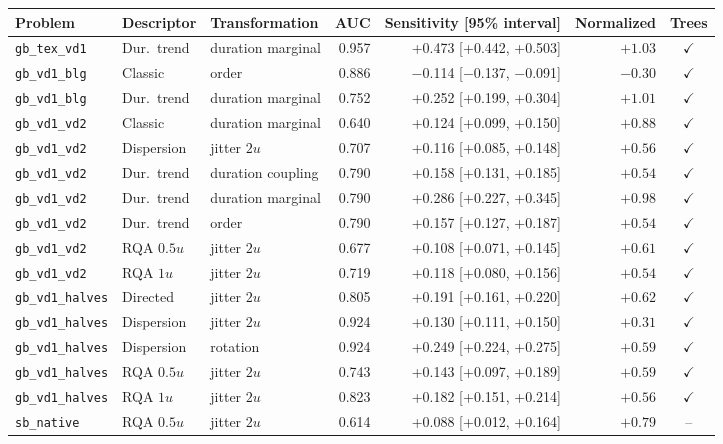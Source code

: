 \begin{tabular}{lllrrrc}
\toprule
Problem & Descriptor & Transformation & AUC & Sensitivity [95\% interval] & Normalized & Trees \\
\midrule
\texttt{gb\_tex\_vd1} & Dur.\ trend & duration marginal & 0.957 & +0.473 [+0.442, +0.503] & $+1.03$ & $\checkmark$ \\
\texttt{gb\_vd1\_blg} & Classic & order & 0.886 & $-$0.114 [$-$0.137, $-$0.091] & $-0.30$ & $\checkmark$ \\
\texttt{gb\_vd1\_blg} & Dur.\ trend & duration marginal & 0.752 & +0.252 [+0.199, +0.304] & $+1.01$ & $\checkmark$ \\
\texttt{gb\_vd1\_vd2} & Classic & duration marginal & 0.640 & +0.124 [+0.099, +0.150] & $+0.88$ & $\checkmark$ \\
\texttt{gb\_vd1\_vd2} & Dispersion & jitter $2u$ & 0.707 & +0.116 [+0.085, +0.148] & $+0.56$ & $\checkmark$ \\
\texttt{gb\_vd1\_vd2} & Dur.\ trend & duration coupling & 0.790 & +0.158 [+0.131, +0.185] & $+0.54$ & $\checkmark$ \\
\texttt{gb\_vd1\_vd2} & Dur.\ trend & duration marginal & 0.790 & +0.286 [+0.227, +0.345] & $+0.98$ & $\checkmark$ \\
\texttt{gb\_vd1\_vd2} & Dur.\ trend & order & 0.790 & +0.157 [+0.127, +0.187] & $+0.54$ & $\checkmark$ \\
\texttt{gb\_vd1\_vd2} & RQA $0.5u$ & jitter $2u$ & 0.677 & +0.108 [+0.071, +0.145] & $+0.61$ & $\checkmark$ \\
\texttt{gb\_vd1\_vd2} & RQA $1u$ & jitter $2u$ & 0.719 & +0.118 [+0.080, +0.156] & $+0.54$ & $\checkmark$ \\
\texttt{gb\_vd1\_halves} & Directed & jitter $2u$ & 0.805 & +0.191 [+0.161, +0.220] & $+0.62$ & $\checkmark$ \\
\texttt{gb\_vd1\_halves} & Dispersion & jitter $2u$ & 0.924 & +0.130 [+0.111, +0.150] & $+0.31$ & $\checkmark$ \\
\texttt{gb\_vd1\_halves} & Dispersion & rotation & 0.924 & +0.249 [+0.224, +0.275] & $+0.59$ & $\checkmark$ \\
\texttt{gb\_vd1\_halves} & RQA $0.5u$ & jitter $2u$ & 0.743 & +0.143 [+0.097, +0.189] & $+0.59$ & $\checkmark$ \\
\texttt{gb\_vd1\_halves} & RQA $1u$ & jitter $2u$ & 0.823 & +0.182 [+0.151, +0.214] & $+0.56$ & $\checkmark$ \\
\texttt{sb\_native} & RQA $0.5u$ & jitter $2u$ & 0.614 & +0.088 [+0.012, +0.164] & $+0.79$ & -- \\

\end{tabular}

